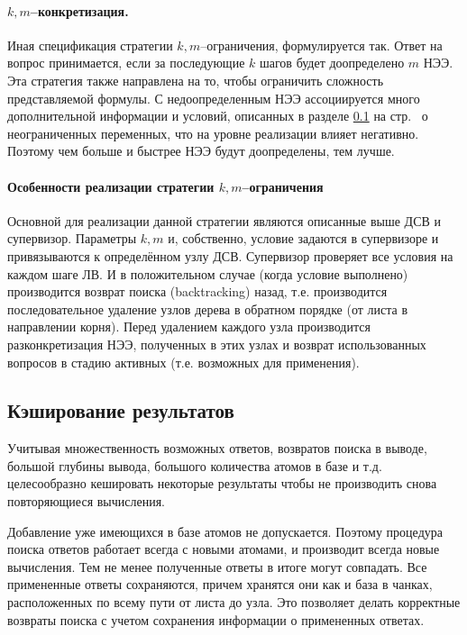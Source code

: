 \paragraph{$k,m$--конкретизация.} Иная спецификация стратегии $k,m$--ограничения, формулируется так. Ответ на вопрос принимается, если за последующие $k$ шагов будет доопределено $m$ НЭЭ. Эта стратегия также направлена на то, чтобы ограничить сложность представляемой формулы. С недоопределенным НЭЭ ассоциируется много дополнительной информации и условий, описанных в разделе \ref{} на стр.~\pageref{} о неограниченных переменных, что на уровне реализации влияет негативно. Поэтому чем больше и быстрее НЭЭ будут доопределены, тем лучше.

\paragraph{Особенности реализации стратегии $k,m$--ограничения}
Основной для реализации данной стратегии являются описанные выше ДСВ и супервизор. Параметры $k,m$ и, собственно, условие задаются в супервизоре и привязываются к определённом узлу ДСВ. Супервизор проверяет все условия на каждом шаге ЛВ. И в положительном случае (когда условие выполнено) производится возврат поиска (backtracking) назад, т.е. производится последовательное удаление узлов дерева в обратном порядке (от листа в направлении корня). Перед удалением каждого узла производится разконкретизация НЭЭ, полученных в этих узлах и возврат использованных вопросов в стадию активных (т.е. возможных для применения).

\subsection{Кэширование результатов}
Учитывая множественность возможных ответов, возвратов поиска в выводе, большой глубины вывода, большого количества атомов в базе и т.д. целесообразно кешировать некоторые результаты чтобы не производить снова повторяющиеся вычисления.

Добавление уже имеющихся в базе атомов не допускается. Поэтому процедура поиска ответов работает всегда с новыми атомами, и производит всегда новые вычисления. Тем не менее полученные ответы в итоге могут совпадать. Все примененные ответы сохраняются, причем хранятся они как и база в чанках, расположенных по всему пути от листа до узла. Это позволяет делать корректные возвраты поиска с учетом сохранения информации о примененных ответах.

